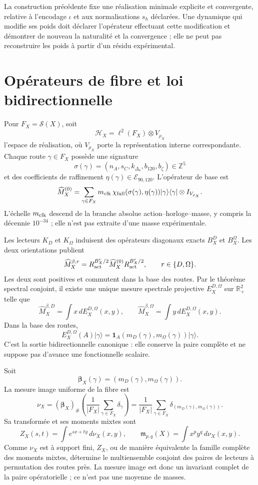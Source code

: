 La construction précédente fixe une réalisation minimale explicite et convergente,
relative à l'encodage \(\iota\) et aux normalisations \(s_h\) déclarées.
Une dynamique qui modifie ses poids doit déclarer l'opérateur effectuant cette
modification et démontrer de nouveau la naturalité et la convergence ; elle ne peut pas
reconstruire les poids à partir d'un résidu expérimental.

\section{Opérateurs de fibre et loi bidirectionnelle}

Pour \(F_X=\mathscr S(X)\), soit
\[
 \mathcal H_X=\ell^2(F_X)\otimes V_{\rho_X}
\]
l'espace de réalisation, où \(V_{\rho_X}\) porte la représentation
interne correspondante. Chaque route \(\gamma\in F_X\) possède une signature
\[
 \sigma(\gamma)
 =(n_A,s_C,k_{\Delta_4},b_{120},b_\zeta)\in\mathbb Z^5
\]
et des coefficients de raffinement
\(\eta(\gamma)\in\mathcal E_{90,120}\). L'opérateur de base est
\[
 \widehat M_X^{(0)}
 =\sum_{\gamma\in F_X}
 m_{\rm clk}\,
 \chi_{\rm full}(\sigma(\gamma),\eta(\gamma))
 |\gamma\rangle\langle\gamma|\otimes I_{V_{\rho_X}}.
\]
L'échelle \(m_{\rm clk}\) descend de la branche absolue
action--horloge--masse, y compris la décennie \(10^{-34}\) ; elle n'est pas extraite d'une
masse expérimentale.

Les lecteurs \(K_D\) et \(K_\Omega\) induisent des opérateurs diagonaux exacts
\(B_X^D\) et \(B_X^\Omega\). Les deux orientations publient
\[
 \widehat M_X^{\beta,r}
 =R_{\rm act}^{B_X^r/2}\widehat M_X^{(0)}
  R_{\rm act}^{B_X^r/2},
 \qquad r\in\{D,\Omega\}.
\]
Les deux sont positives et commutent dans la base des routes. Par le théorème spectral
conjoint, il existe une unique mesure spectrale projective
\(E_X^{D,\Omega}\) sur \(\mathbb R_+^2\) telle que
\[
 \widehat M_X^{\beta,D}
 =\int x\,dE_X^{D,\Omega}(x,y),
 \qquad
 \widehat M_X^{\beta,\Omega}
 =\int y\,dE_X^{D,\Omega}(x,y).
\]
Dans la base des routes,
\[
 E_X^{D,\Omega}(A)|\gamma\rangle
 =\mathbf 1_A\!\left(m_D(\gamma),m_\Omega(\gamma)\right)
  |\gamma\rangle.
\]
C'est la sortie bidirectionnelle canonique : elle conserve la paire complète et ne
suppose pas d'avance une fonctionnelle scalaire.

Soit
\[
 \boldsymbol\beta_X(\gamma)
 =(m_D(\gamma),m_\Omega(\gamma)).
\]
La mesure image uniforme de la fibre est
\[
 \nu_X=(\boldsymbol\beta_X)_\#
 \left(\frac1{|F_X|}\sum_{\gamma\in F_X}\delta_\gamma\right)
 =\frac1{|F_X|}\sum_{\gamma\in F_X}
 \delta_{(m_D(\gamma),m_\Omega(\gamma))}.
\]
Sa transformée et ses moments mixtes sont
\[
 Z_X(s,t)=\int e^{sx+ty}\,d\nu_X(x,y),
 \qquad
 \mathfrak m_{p,q}(X)=\int x^py^q\,d\nu_X(x,y).
\]
Comme \(\nu_X\) est à support fini, \(Z_X\), ou de manière équivalente la famille
complète des moments mixtes, détermine le multiensemble conjoint des paires de
lecteurs à permutation des routes près. La mesure image est donc un
invariant complet de la paire opératorielle ; ce n'est pas une moyenne de masses.

